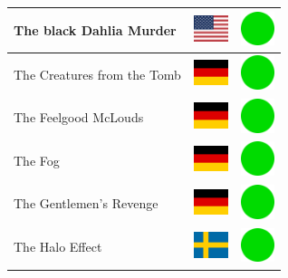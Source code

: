 \documentclass[12pt, a4paper, twoside]{report}
\begin{document}
\begin{center}
\begin{longtable}{|p{5cm}|p{2cm}|p{2cm}|}
The black Dahlia Murder & \includegraphics[width=1cm]{4x3/us} & \includegraphics[width=1cm]{likes/y} \\ \hline
The Creatures from the Tomb & \includegraphics[width=1cm]{4x3/de} & \includegraphics[width=1cm]{likes/y} \\ \hline
The Feelgood McLouds & \includegraphics[width=1cm]{4x3/de} & \includegraphics[width=1cm]{likes/y} \\ \hline
The Fog & \includegraphics[width=1cm]{4x3/de} & \includegraphics[width=1cm]{likes/y} \\ \hline
The Gentlemen's Revenge & \includegraphics[width=1cm]{4x3/de} & \includegraphics[width=1cm]{likes/y} \\ \hline
The Halo Effect & \includegraphics[width=1cm]{4x3/se} & \includegraphics[width=1cm]{likes/y} \\ \hline

\end{longtable}
\end{center}
\end{document}
